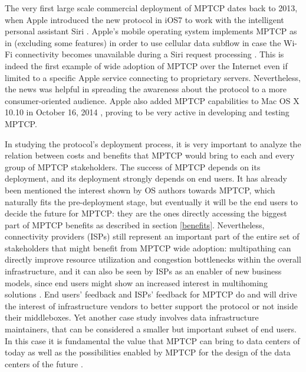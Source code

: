 The very first large scale commercial deployment of MPTCP dates back to 2013, when Apple introduced the new protocol in iOS7 to work with the intelligent personal assistant Siri \cite{apple}. Apple's mobile operating system implements MPTCP as in  (excluding some features) in order to use cellular data subflow in case the Wi-Fi connectivity becomes unavailable during a Siri request processing \cite{apple}. This is indeed the first example of wide adoption of MPTCP over the Internet even if limited to a specific Apple service connecting to proprietary servers. Nevertheless, the news was helpful in spreading the awareness about the protocol to a more consumer-oriented audience. Apple also added MPTCP capabilities to Mac OS X 10.10 in October 16, 2014 \cite{osx}, proving to be very active in developing and testing MPTCP.

In studying the protocol's deployment process, it is very important to analyze the relation between costs and benefits that MPTCP would bring to each and every group of MPTCP stakeholders.
The success of MPTCP depends on its deployment, and its deployment strongly depends on end users. It has already been mentioned the interest shown by OS authors towards MPTCP, which naturally fits the pre-deployment stage, but eventually it will be the end users to decide the future for MPTCP: they are the ones directly accessing the biggest part of MPTCP benefits as described in section \ref{benefits}. Nevertheless, connectivity providers (ISPs) still represent an important part of the entire set of stakeholders that might benefit from MPTCP wide adoption: multipathing can directly improve resource utilization and congestion bottlenecks within the overall infrastructure, and it can also be seen by ISPs as an enabler of new business models, since end users might show an increased interest in multihoming solutions \cite{DBLP:conf/fia/2010}. End users' feedback and ISPs' feedback for MPTCP do and will drive the interest of infrastructure vendors to better support the protocol or not inside their middleboxes. 
Yet another case study involves data infrastructure maintainers, that can be considered a smaller but important subset of end users. In this case it is fundamental the value that MPTCP can bring to data centers of today as well as the possibilities enabled by MPTCP for the design of the data centers of the future \cite{Raiciu:2011:IDP:2043164.2018467}.

